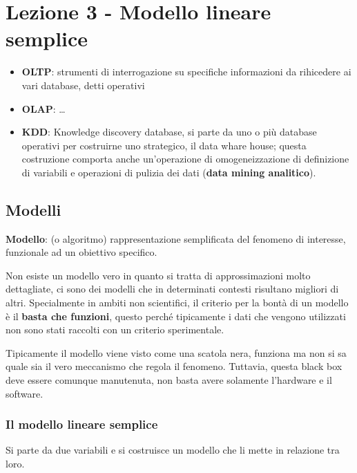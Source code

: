 \chapter{Lezione 3 - Modello lineare
semplice}\label{lezione-3---modello-lineare-semplice}

\begin{itemize}
\item
  \textbf{OLTP}: strumenti di interrogazione su specifiche informazioni
  da rihicedere ai vari database, detti operativi
\item
  \textbf{OLAP}: \ldots{}
\item
  \textbf{KDD}: Knowledge discovery database, si parte da uno o più
  database operativi per costruirne uno strategico, il data whare house;
  questa costruzione comporta anche un'operazione di omogeneizzazione di
  definizione di variabili e operazioni di pulizia dei dati (\textbf{data
  mining analitico}).
\end{itemize}

\section{Modelli}\label{modelli}

\textbf{Modello}: (o algoritmo) rappresentazione semplificata del
fenomeno di interesse, funzionale ad un obiettivo specifico.

Non esiste un modello vero in quanto si tratta di approssimazioni molto
dettagliate, ci sono dei modelli che in determinati contesti risultano
migliori di altri. Specialmente in ambiti non scientifici, il criterio
per la bontà di un modello è il \textbf{basta che funzioni}, questo
perché tipicamente i dati che vengono utilizzati non sono stati raccolti
con un criterio sperimentale.

Tipicamente il modello viene visto come una scatola nera, funziona ma
non si sa quale sia il vero meccanismo che regola il fenomeno. Tuttavia,
questa black box deve essere comunque manutenuta, non basta avere
solamente l'hardware e il software.

\subsection{Il modello lineare
semplice}\label{il-modello-lineare-semplice}

Si parte da due variabili e si costruisce un modello che li mette in
relazione tra loro.

